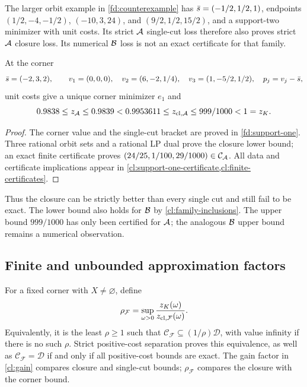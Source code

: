 The larger orbit example in \cref{fd:counterexample} has
$\bar s=(-1/2,1/2,1)$, endpoints
$(1/2,-4,-1/2)$, $(-10,3,24)$, and $(9/2,1/2,15/2)$, and a
support-two minimizer with unit costs. Its strict $\mathcal A$ single-cut
loss therefore also proves strict $\mathcal A$ closure loss. Its numerical
$\mathcal B$ loss is not an exact certificate for that family.

\begin{proposition}\label{cl:support-one}
At the corner
\[
 \bar s=(-2,3,2),\qquad v_1=(0,0,0),\quad
 v_2=(6,-2,1/4),\quad v_3=(1,-5/2,1/2),\quad p_j=v_j-\bar s,
\]
unit costs give a unique corner minimizer $e_1$ and
\[
 0.9838\le z_{\mathcal A}\le0.9839
 <0.9953611\le z_{\mathrm{cl},\mathcal A}
 \le999/1000<1=z_K.
\]
\end{proposition}

\begin{proof}
The corner value and the single-cut bracket are proved in
\cref{fd:support-one}. Three rational orbit sets and a rational LP dual
prove the closure lower bound; an exact finite certificate proves
$(24/25,1/100,29/1000)\in\mathcal C_{\mathcal A}$.
All data and certificate implications appear in
\cref{cl:support-one-certificate,cl:finite-certificates}.
\end{proof}

Thus the closure can be strictly better than every single cut and still
fail to be exact. The lower bound also holds for $\mathcal B$ by
\cref{cl:family-inclusions}. The upper bound $999/1000$ has only been
certified for $\mathcal A$; the analogous $\mathcal B$ upper bound remains a
numerical observation.

\subsection{Finite and unbounded approximation factors}\label{cl:factors}

For a fixed corner with $X\ne\varnothing$, define
\[
 \rho_{\mathcal F}
 =\sup_{\omega>0}\frac{z_K(\omega)}{z_{\mathrm{cl},\mathcal F}(\omega)}.
\]
Equivalently, it is the least $\rho\ge1$ such that
$\mathcal C_{\mathcal F}\subseteq(1/\rho)\mathcal D$, with value infinity
if there is no such $\rho$. Strict positive-cost separation proves this
equivalence, as well as
$\mathcal C_{\mathcal F}=\mathcal D$ if and only if all positive-cost
bounds are exact. The gain factor in \cref{cl:gain} compares closure and
single-cut bounds; $\rho_{\mathcal F}$ compares the closure with the
corner bound.

